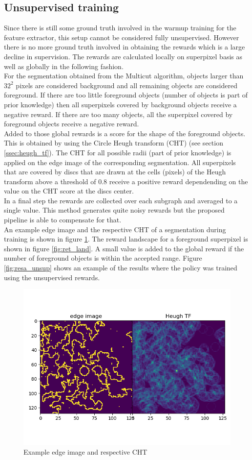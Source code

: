 \subsection{Unsupervised training}

Since there is still some ground truth involved in the warmup training for the feature extractor, this setup cannot be considered fully unsupervised. However there is no more ground truth involved in obtaining the rewards which is a large decline in supervision. The rewards are calculated locally on superpixel basis as well as globally in the following fashion.\\
For the segmentation obtained from the Multicut algorithm, objects larger than $32^2$ pixels are considered background and all remaining objects are considered foreground. If there are too little foreground objects (number of objects is part of prior knowledge) then all superpixels covered by background objects receive a negative reward. If there are too many objects, all the superpixel covered by foreground objects receive a negative reward.\\
Added to those global rewards is a score for the shape of the foreground objects. This is obtained by using the Circle Heugh transform (CHT) (see section \ref{ssec:heugh_tf}). The CHT for all possible radii (part of prior knowledge) is applied on the edge image of the corresponding segmentation. All superpixels that are covered by discs that are drawn at the cells (pixels) of the Heugh transform above a threshold of $0.8$ receive a positive reward dependending on the value on the CHT score at the discs center.\\
In a final step the rewards are collected over each subgraph and averaged to a single value. This method generates quite noisy rewards but the proposed pipeline is able to compensate for that.\\
An example edge image and the respective CHT of a segmentation during training is shown in figure \ref{fig:seg_heugh}. The reward landscape for a foreground superpixel is shown in figure \ref{fig:ret_land}. A small value is added to the global reward if the number of foreground objects is within the accepted range. Figure \ref{fig:resa_unsup} shows an example of the results where the policy was trained using the unsupervised rewards.
\begin{figure}[ht!]
	\centering
	\includegraphics[width=.8\textwidth]{figures/plots/bad_seg_edge_heugh.png}
	\caption{Example edge image and respective CHT}
	\label{fig:seg_heugh}
\end{figure}
